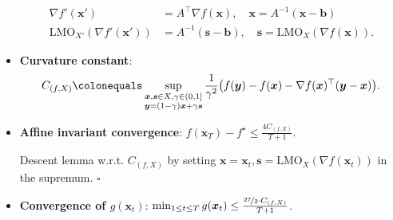 \documentclass[8pt,a4paper]{extarticle}
\renewcommand{\proof}[1]{\begin{tcolorbox}#1 \hfill $\square$\end{tcolorbox}}
\newcommand{\lft}{\mathopen{}\mathclose\bgroup\left}
\newcommand{\rgt}{\aftergroup\egroup\right}
\renewcommand{\vec}[1]{\bm{#1}}
\newcommand{\mat}[1]{#1}
\newenvironment{topic}[1]
{\textbf{\sffamily \colorbox{black}{\rlap{\textbf{\textcolor{white}{#1}}}\hspace{\linewidth}\hspace{-2\fboxsep}}} \\ \vspace{0.2cm}}
{}
\begin{document}
\begin{multicols*}{2}
\begin{topic}{Frank-Wolfe}
\begin{itemize}
                  \begin{align*}
                      \nabla f'(\vec{x}')                    & = \mat{A}^\top \nabla f(\vec{x}), \quad \vec{x} = \mat{A}^{-1} (\vec{x} - \vec{b})    \\
                      \mathrm{LMO}_{X'}(\nabla f'(\vec{x}')) & = \mat{A}^{-1}(\vec{s} - \vec{b}), \quad \vec{s} = \mathrm{LMO}_X(\nabla f(\vec{x})).
                  \end{align*}
            \item \textbf{Curvature constant}: \[
                      C_{(f,X)} \colonequals \sup_{\substack{\vec{x}, \vec{s}\in X, \gamma \in (0,1] \\ \vec{y} = (1-\gamma)\vec{x} + \gamma \vec{s}}} \frac{1}{\gamma^2}\lft( f(\vec{y}) - f(\vec{x}) - \nabla f(\vec{x})^\top (\vec{y} - \vec{x}) \rgt).
                  \]
            \item \textbf{Affine invariant convergence}: $f(\vec{x}_T) - f^\star \leq \frac{4 C_{(f,X)}}{T+1}$.
                  \proof{Descent lemma w.r.t. $C_{(f,X)}$ by setting $\vec{x} = \vec{x}_t, \vec{s} = \mathrm{LMO}_X(\nabla f(\vec{x}_t))$ in the supremum.}
            \item \textbf{Convergence of $g(\vec{x}_t)$}: $\min_{1 \leq t \leq T} g(\vec{x}_t) \leq \frac{\nicefrac{27}{2} \cdot C_{(f, X)}}{T+1}$.
        \end{itemize}
    \end{topic}


\end{multicols*}
\end{document}
